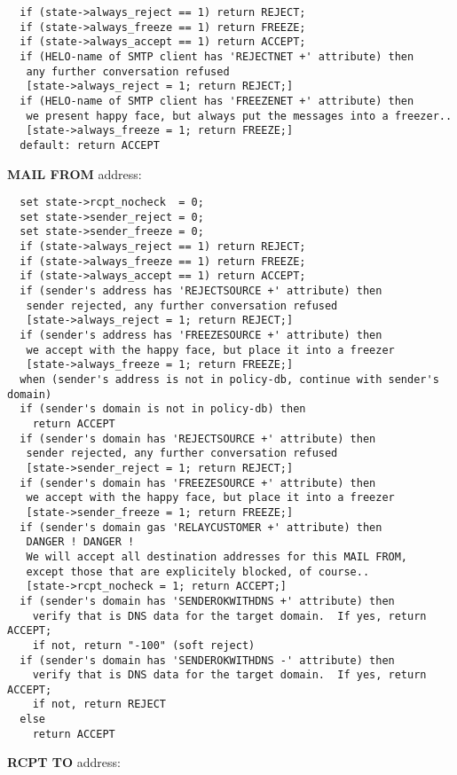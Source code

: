 \begin{verbatim}
  if (state->always_reject == 1) return REJECT;
  if (state->always_freeze == 1) return FREEZE;
  if (state->always_accept == 1) return ACCEPT;
  if (HELO-name of SMTP client has 'REJECTNET +' attribute) then
   any further conversation refused
   [state->always_reject = 1; return REJECT;]
  if (HELO-name of SMTP client has 'FREEZENET +' attribute) then
   we present happy face, but always put the messages into a freezer..
   [state->always_freeze = 1; return FREEZE;]
  default: return ACCEPT
\end{verbatim}


{\bf MAIL FROM} address:

\begin{verbatim}
  set state->rcpt_nocheck  = 0;
  set state->sender_reject = 0;
  set state->sender_freeze = 0;
  if (state->always_reject == 1) return REJECT;
  if (state->always_freeze == 1) return FREEZE;
  if (state->always_accept == 1) return ACCEPT;
  if (sender's address has 'REJECTSOURCE +' attribute) then
   sender rejected, any further conversation refused
   [state->always_reject = 1; return REJECT;]
  if (sender's address has 'FREEZESOURCE +' attribute) then
   we accept with the happy face, but place it into a freezer
   [state->always_freeze = 1; return FREEZE;]
  when (sender's address is not in policy-db, continue with sender's domain)
  if (sender's domain is not in policy-db) then
    return ACCEPT
  if (sender's domain has 'REJECTSOURCE +' attribute) then
   sender rejected, any further conversation refused
   [state->sender_reject = 1; return REJECT;]
  if (sender's domain has 'FREEZESOURCE +' attribute) then
   we accept with the happy face, but place it into a freezer
   [state->sender_freeze = 1; return FREEZE;]
  if (sender's domain gas 'RELAYCUSTOMER +' attribute) then
   DANGER ! DANGER !
   We will accept all destination addresses for this MAIL FROM,
   except those that are explicitely blocked, of course..
   [state->rcpt_nocheck = 1; return ACCEPT;]
  if (sender's domain has 'SENDEROKWITHDNS +' attribute) then
    verify that is DNS data for the target domain.  If yes, return ACCEPT;
    if not, return "-100" (soft reject)
  if (sender's domain has 'SENDEROKWITHDNS -' attribute) then
    verify that is DNS data for the target domain.  If yes, return ACCEPT;
    if not, return REJECT
  else
    return ACCEPT
\end{verbatim}


{\bf RCPT TO} address:

